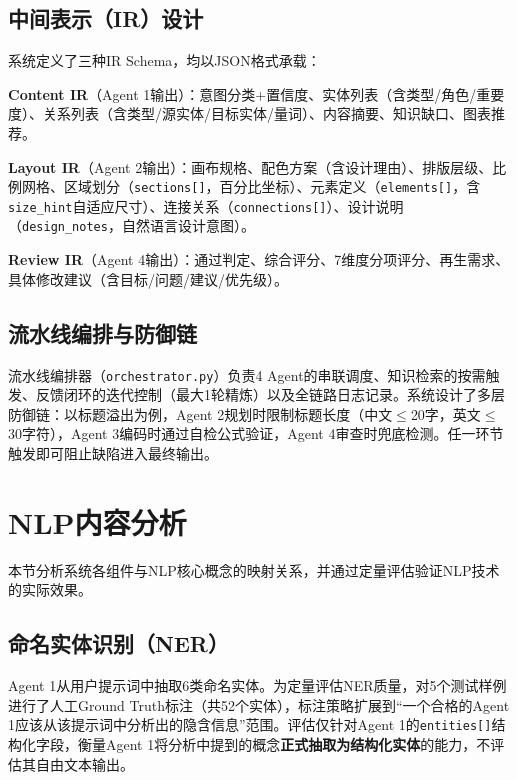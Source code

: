 \documentclass[11pt,a4paper]{article}
\begin{document}
\subsection{中间表示（IR）设计}

系统定义了三种IR Schema，均以JSON格式承载：

\noindent\textbf{Content IR}（Agent 1输出）：意图分类+置信度、实体列表（含类型/角色/重要度）、关系列表（含类型/源实体/目标实体/量词）、内容摘要、知识缺口、图表推荐。

\noindent\textbf{Layout IR}（Agent 2输出）：画布规格、配色方案（含设计理由）、排版层级、比例网格、区域划分（\texttt{sections[]}，百分比坐标）、元素定义（\texttt{elements[]}，含\texttt{size\_hint}自适应尺寸）、连接关系（\texttt{connections[]}）、设计说明（\texttt{design\_notes}，自然语言设计意图）。

\noindent\textbf{Review IR}（Agent 4输出）：通过判定、综合评分、7维度分项评分、再生需求、具体修改建议（含目标/问题/建议/优先级）。

\subsection{流水线编排与防御链}

流水线编排器（\texttt{orchestrator.py}）负责4 Agent的串联调度、知识检索的按需触发、反馈闭环的迭代控制（最大1轮精炼）以及全链路日志记录。系统设计了多层防御链：以标题溢出为例，Agent 2规划时限制标题长度（中文$\le$20字，英文$\le$30字符），Agent 3编码时通过自检公式验证，Agent 4审查时兜底检测。任一环节触发即可阻止缺陷进入最终输出。

\section{NLP内容分析}

本节分析系统各组件与NLP核心概念的映射关系，并通过定量评估验证NLP技术的实际效果。

\subsection{命名实体识别（NER）}

Agent 1从用户提示词中抽取6类命名实体。为定量评估NER质量，对5个测试样例进行了人工Ground Truth标注（共52个实体），标注策略扩展到“一个合格的Agent 1应该从该提示词中分析出的隐含信息”范围。评估仅针对Agent 1的\texttt{entities[]}结构化字段，衡量Agent 1将分析中提到的概念\textbf{正式抽取为结构化实体}的能力，不评估其自由文本输出。
\end{document}

